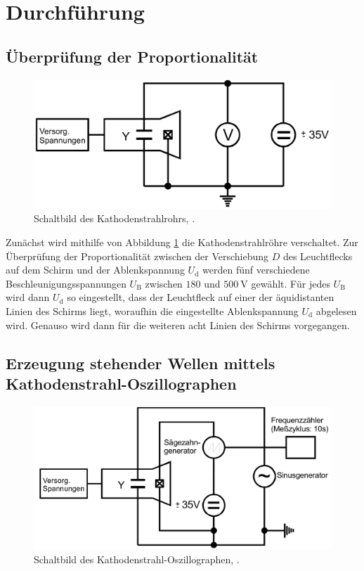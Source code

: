 \section{Durchführung}
\label{sec:Durchführung}

\subsection{Überprüfung der Proportionalität}

\begin{figure}[h!]
	\centering
	\includegraphics[width=1\linewidth]{../../aufbau1}
	\caption{Schaltbild des Kathodenstrahlrohrs, \cite[5]{anleitung501}.}
	\label{fig:aufbau1}
\end{figure}

Zunächst wird mithilfe von Abbildung \ref{fig:aufbau1} die Kathodenstrahlröhre verschaltet. Zur Überprüfung der Proportionalität zwischen der Verschiebung $D$ des Leuchtflecks auf dem Schirm und der Ablenkspannung $U_{\text{d}}$ 
werden fünf verschiedene Beschleunigungsspannungen $U_{\text{B}}$ zwischen $180$ und $\SI{500}{\volt}$ gewählt. Für jedes $U_{\text{B}}$ wird dann $U_{\text{d}}$ so eingestellt, dass der Leuchtfleck auf einer der äquidistanten Linien 
des Schirms liegt, woraufhin die eingestellte Ablenkspannung $U_{\text{d}}$ abgelesen wird. Genauso wird dann für die weiteren acht Linien des Schirms vorgegangen. 

\subsection{Erzeugung stehender Wellen mittels Kathodenstrahl-Oszillographen}

\begin{figure}[h!]
	\centering
	\includegraphics[width=1\linewidth]{../../aufbau2}
	\caption{Schaltbild des Kathodenstrahl-Oszillographen, \cite[5]{anleitung501}.}
	\label{fig:aufbau2}
\end{figure}

